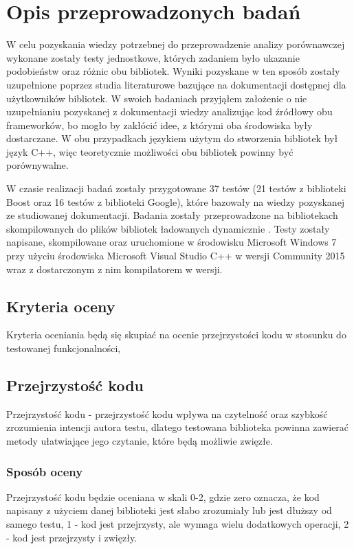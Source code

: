 \documentclass[12pt,a4paper,notitlepage]{report}
\begin{document}
\chapter{Opis przeprowadzonych badań}

W celu pozyskania wiedzy potrzebnej do przeprowadzenie analizy porównawczej wykonane zostały testy jednostkowe, których zadaniem było ukazanie podobieństw oraz różnic obu bibliotek. Wyniki pozyskane w ten sposób zostały uzupełnione poprzez studia literaturowe bazujące na dokumentacji dostępnej dla użytkowników bibliotek.
W swoich badaniach przyjąłem założenie o nie uzupełnianiu pozyskanej z dokumentacji wiedzy analizując kod źródłowy obu frameworków, bo mogło by zakłócić idee, z którymi oba środowiska były dostarczane. W obu przypadkach językiem użytym do stworzenia bibliotek był język C++, więc teoretycznie możliwości obu bibliotek powinny być porównywalne.

W czasie realizacji badań zostały przygotowane 37 testów (21 testów z biblioteki Boost oraz 16 testów z biblioteki Google), które bazowały na wiedzy pozyskanej ze studiowanej dokumentacji.
Badania zostały przeprowadzone na bibliotekach skompilowanych do plików bibliotek ładowanych dynamicznie \cite{DLL}. Testy zostały napisane, skompilowane oraz uruchomione w środowisku Microsoft Windows 7 przy użyciu środowiska Microsoft Visual Studio C++ w wersji Community 2015 wraz z dostarczonym z nim kompilatorem w wersji.

\section{Kryteria oceny}

Kryteria oceniania będą się skupiać na ocenie przejrzystości kodu w stosunku do testowanej funkcjonalności,

\section{Przejrzystość kodu}

Przejrzystość kodu - przejrzystość kodu wpływa na czytelność oraz szybkość zrozumienia intencji autora testu, dlatego testowana biblioteka powinna zawierać metody ułatwiające jego czytanie, które będą możliwie zwięzłe.

\subsection{Sposób oceny}
Przejrzystość kodu będzie oceniana w skali 0-2, gdzie zero oznacza, że kod napisany z użyciem danej biblioteki jest słabo zrozumiały lub jest dłuższy od samego testu, 1 - kod jest przejrzysty, ale wymaga wielu dodatkowych operacji, 2 - kod jest przejrzysty i zwięzły.
\end{document}
